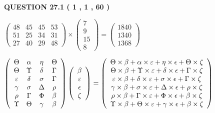 \documentclass[12pt]{article}
\begin{document}
   
  
  
{\textbf{\large{QUESTION
27.1 
 (           1 ,           1 ,          60 )
}}}

 
$\left( \begin{array}{ccccccccccccccc}
          48  & 
          45  & 
          45  & 
          53  \\ 
          51  & 
          25  & 
          34  & 
          31  \\ 
          27  & 
          40  & 
          29  & 
          48
\end{array}\right) \times
\left( \begin{array}{c}
           7  \\ 
           9  \\ 
          15  \\ 
           8
\end{array}\right)  =
\left( \begin{array}{c}
        1840  \\ 
        1340  \\ 
        1368
\end{array}\right)  $
 
$  %
 \left( \begin{array}
 {
 c
 c
 c
 c
 }
 \Theta & 
 \alpha & 
 \eta & 
 \Theta \\ 
 \Theta & 
 \Upsilon & 
 \delta & 
 \Gamma \\ 
 \varepsilon & 
 \delta & 
 \sigma & 
 \Gamma \\ 
 \gamma & 
 \sigma & 
 \Delta & 
 \rho \\ 
 \rho & 
 \Gamma & 
 \Phi & 
 \beta \\ 
 \Upsilon & 
 \Theta & 
 \gamma & 
 \beta
 \end{array} \right)
 \left( \begin{array}
 {
 c
 }
 \beta \\ 
 \varepsilon \\ 
 \epsilon \\ 
                    \zeta
 \end{array} \right)
=
 \left( \begin{array}
 {
 c
 }
  \Theta \times  \beta +  \alpha \times  \varepsilon +  \eta \times  \epsilon +  \Theta \times                     \zeta \\ 
  \Theta \times  \beta +  \Upsilon \times  \varepsilon +  \delta \times  \epsilon +  \Gamma \times                     \zeta \\ 
  \varepsilon \times  \beta +  \delta \times  \varepsilon +  \sigma \times  \epsilon +  \Gamma \times                     \zeta \\ 
  \gamma \times  \beta +  \sigma \times  \varepsilon +  \Delta \times  \epsilon +  \rho \times                     \zeta \\ 
  \rho \times  \beta +  \Gamma \times  \varepsilon +  \Phi \times  \epsilon +  \beta \times                     \zeta \\ 
  \Upsilon \times  \beta +  \Theta \times  \varepsilon +  \gamma \times  \epsilon +  \beta \times                     \zeta
 \end{array} \right)
$
 
\end{document}
